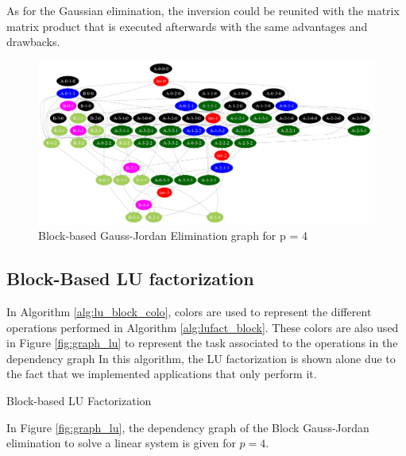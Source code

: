 As for the Gaussian elimination, the inversion could be reunited with the matrix matrix product that is executed afterwards with the same advantages and drawbacks.

\begin{figure}[h]
	\centering
	\includegraphics[width=\textwidth]{sls_gj_graph_n4}
	\caption{Block-based Gauss-Jordan Elimination graph for p = 4\label{fig:graph_sls_gj}}
\end{figure}

\subsection{Block-Based LU factorization}

In Algorithm \ref{alg:lu_block_colo}, colors are used to represent the different operations performed in Algorithm \ref{alg:lufact_block}.
These colors are also used in Figure \ref{fig:graph_lu} to represent the task associated to the operations in the dependency graph
In this algorithm, the LU factorization is shown alone due to the fact that we implemented applications that only perform it.

\begin{algorithm}[h]
	\DontPrintSemicolon
	\caption{Block-based LU Factorization\label{alg:lu_block_colo}}
\end{algorithm}

In Figure \ref{fig:graph_lu}, the dependency graph of the Block Gauss-Jordan elimination to solve a linear system is given for $p = 4$.

